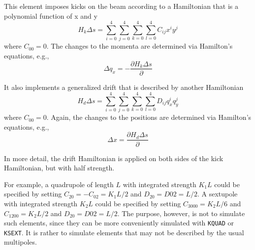 This element imposes kicks on the beam according
to a Hamiltonian that is a polynomial function of x and y 
\begin{equation}
H_k\Delta s = \sum_{i=0}^{4} \sum_{j=0}^{4} \sum_{k=0}^4 \sum_{l=0}^4 C_{ij} x^i y^j 
\end{equation}
where $C_{00} = 0$.
The changes to the momenta are determined via Hamilton's equations, e.g.,
\begin{equation}
\Delta q_x = -\frac{\partial H_k\Delta s}{\partial}
\end{equation}

It also implements a generalized drift that is described by another Hamiltonian
\begin{equation}
H_d\Delta s = \sum_{i=0}^{4} \sum_{j=0}^{4} \sum_{k=0}^4 \sum_{l=0}^4 D_{ij} q_x^i q_y^j 
\end{equation}
where $C_{00} = 0$.
Again, the changes to the positions are determined via Hamilton's equations, e.g., 
\begin{equation}
\Delta x = \frac{\partial H_d\Delta s}{\partial}
\end{equation}

In more detail, the drift Hamiltonian is applied on both sides of the kick Hamiltonian, but with
half strength. 

For example, a quadrupole of length $L$ with integrated strength $K_1 L$  could be specified by setting
$C_{20} = -C_{02} = K_1 L/2$ and $D_20 = D02 = L/2$.
A sextupole with integrated strength $K_2 L$ could be specified by setting $C_{3000} = K_2 L/6$ and $C_{1200} = K_2 L/2$
and $D_20 = D02 = L/2$.
The purpose, however, is not to simulate such elements, since they can be more conveniently simulated with 
\verb|KQUAD| or \verb|KSEXT|.
It is rather to simulate elements that may not be described by the usual multipoles.